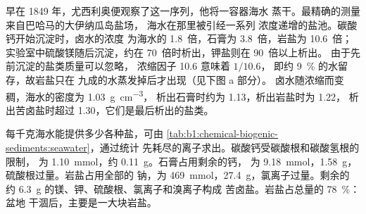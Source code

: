 早在 1849 年，尤西利奥便观察了这一序列，他将一容器海水
蒸干。最精确的测量来自巴哈马的大伊纳瓜岛盐场，
海水在那里被引经一系列
浓度递增的盐池。碳酸钙开始沉淀时，卤水的浓度
为海水的 1.8~倍，石膏为 3.8~倍，岩盐为
10.6~倍；实验室中硫酸镁随后沉淀，约在 70~倍时析出，钾盐则在 90~倍以上析出。
由于先前沉淀的盐类质量可以忽略，
浓缩因子 10.6 意味着 $1/10.6$，
即约 \qty{9}{\%} 的水留存，故岩盐只在
九成的水蒸发掉后才出现（见下图 a 部分）。
卤水随浓缩而变稠，海水的密度为 \qty{1.03}{g.cm^{-3}}，
析出石膏时约为 \num{1.13}，析出岩盐时为 \num{1.22}，
析出苦卤盐时超过 \num{1.30}，它们是最后析出的盐类。

每千克海水能提供多少各种盐，可由
\cref{tab:b1:chemical-biogenic-sediments:seawater}，通过统计
先耗尽的离子求出。碳酸钙受碳酸根和碳酸氢根的限制，
为 \qty{1.10}{mmol}，约 \qty{0.11}{g}。石膏占用剩余的钙，
为 \qty{9.18}{mmol}，\qty{1.58}{g}，硫酸根过量。岩盐占用全部的
钠，为 \qty{469}{mmol}，\qty{27.4}{g}，氯离子过量。剩余的
约 \qty{6.3}{g} 的镁、钾、硫酸根、氯离子和溴离子构成
苦卤盐。岩盐占总量的 \qty{78}{\%}：盆地
干涸后，主要是一大块岩盐。

